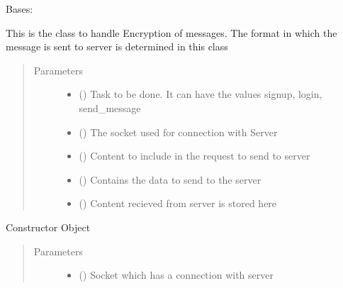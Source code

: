 \documentclass[letterpaper,10pt,english]{sphinxmanual}
\begin{document}
\begin{fulllineitems}
\label{\detokenize{Message:Message.Message}}
Bases: 

This is the class to handle Encryption of messages. The format in which the message is sent to server is determined in this class
\begin{quote}\begin{description}
\item[{Parameters}] \leavevmode\begin{itemize}
\item {} 
 () \textendash{} Task to be done. It can have the values signup, login, send\_message

\item {} 
 () \textendash{} The socket used for connection with Server

\item {} 
 () \textendash{} Content to include in the request to send to server

\item {} 
 () \textendash{} Contains the data to send to the server

\item {} 
 () \textendash{} Content recieved from server is stored here

\end{itemize}

\end{description}\end{quote}

Constructor Object
\begin{quote}\begin{description}
\item[{Parameters}] \leavevmode\begin{itemize}
\item {} 
 () \textendash{} Socket which has a connection with server


\end{itemize}
\end{description}
\end{quote}
\end{fulllineitems}
\end{document}

